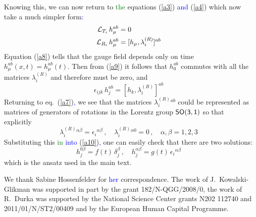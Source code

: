\documentclass[prd,reprint,eqsecnum,nofootinbib]{revtex4-1}
\begin{document}
Knowing this\textcolor{blue}{,} we can now return to \textcolor{green}{the} equations (\ref{a3})\textcolor{blue}{ and }
(\ref{a4}) which now take a much simpler form\textcolor{blue}{:}
\begin{align}
    {\cal L}_{T_i}\,h_\mu^{ab} &= 0\label{a8}\\  {\cal L}_{R_i}\,h_\mu^{ab} &=  [h_\mu,\lambda^{(R)}_i]^{ab}\label{a9}
\end{align}
Equation (\ref{a8}) tells that the gauge field depends only on time
$h_\mu^{ab}(x,t) = h_\mu^{ab}(t)$. Then from (\ref{a9}) it follows
that $h_0^{ab}$ commutes with all the matrices $\lambda^{(R)}_i$ and
therefore must be zero, and
\begin{equation}\label{a10}
\epsilon_{ijk}\, h_j^{ab}=[h_k,\lambda^{(R)}_i]^{ab}
\end{equation}
Returning to eq.\ (\ref{a7})\textcolor{blue}{,} we see that the matrices
$\lambda^{(R)}_i{}^{ab}$ could be represented as matrices of
generators of rotations in the Lorentz group $\sf{SO(3,1)}$ so that
explicitly
\begin{equation}\label{a11}
\lambda^{(R)}_i{}^{\alpha\beta} = \epsilon_i{}^{\alpha\beta}\,,
\quad\lambda^{(R)}_i{}^{\alpha0} =0\,, \quad \alpha,\beta=1,2,3
\end{equation}
Substituting this \textcolor{green}{in} \textcolor{blue}{into} (\ref{a10})\textcolor{blue}{,} one can easily check that there are
two solutions\textcolor{blue}{:}
\begin{equation}\label{a12}
h_j^{0\beta} =f(t) \, \delta_j^\beta\,, \quad h_j^{\alpha\beta} =
g(t)\, \epsilon_i{}^{\alpha\beta}
\end{equation}
which is the ansatz used in the main text.

\begin{acknowledgments}
We thank Sabine Hossenfelder for \textcolor{blue}{her} correspondence. The work of J.\
Kowalski-Glikman was supported in part by the grant
182/N-QGG/2008/0, the work of R.\ Durka was supported by the
National Science Center grants N202 112740 and 2011/01/N/ST2/00409
and by the European Human Capital Programme.
\end{acknowledgments}
\end{document}
